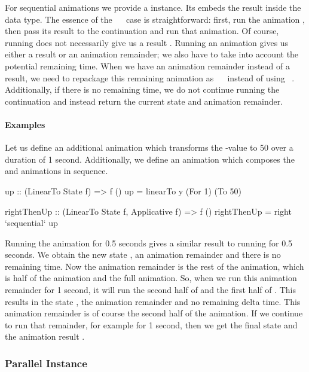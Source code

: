 For sequential animations we provide a  instance. Its  embeds the
result  inside the  data type. The essence of the
~\hs{>>=}~ case is straightforward: first, run the animation
, then pass its result to the continuation  and run that animation.
Of course, running  does not necessarily give us a result . Running
an animation gives us either a result or an animation remainder; we also have
to take into account the potential remaining time. When we have an
animation remainder instead of a result, we need to repackage this remaining
animation as ~\hs{>>=}~ instead of using ~.
Additionally, if there is no remaining time,  we do not continue
running the continuation and instead return the current state and animation
remainder.

\paragraph{Examples}

Let us define an additional animation  which transforms the -value to 50 over a duration of 1 second. Additionally, we define an animation  which composes the  and  animations in sequence.

\begin{code}
up :: (LinearTo State f) => f ()
up = linearTo y (For 1) (To 50)

rightThenUp :: (LinearTo State f, Applicative f) => f ()
rightThenUp = right `sequential` up
\end{code}

Running the  animation for 0.5 seconds gives a similar result
to running  for 0.5 seconds. We obtain the new state , an animation remainder  and there is no remaining time.
Now the animation remainder is the rest of the  animation,
which is half of the  animation and the full  animation. So,
when we run this animation remainder for 1 second, it will run the second half
of  and the first half of .  This results in the state
, the animation remainder  and no remaining delta time.
This animation remainder is of course the second half of the  animation.
If we continue to run that remainder, for example for 1 second, then we get the
final state  and the animation result \hs{()}.

\subsubsection{Parallel Instance}

